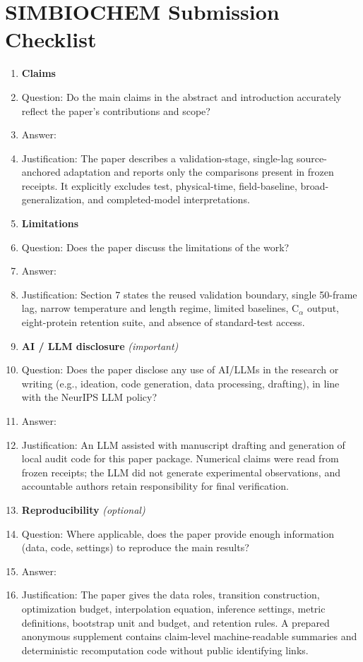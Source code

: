 \documentclass{article}
\newcommand{\CA}{C$_\alpha$}
\begin{document}

\newpage

\section*{SIMBIOCHEM Submission Checklist}

\begin{enumerate}

\item {\bf Claims}
    \item[] Question: Do the main claims in the abstract and introduction accurately reflect the paper's contributions and scope?
    \item[] Answer: \answerYes{}
    \item[] Justification: The paper describes a validation-stage, single-lag source-anchored adaptation and reports only the comparisons present in frozen receipts. It explicitly excludes test, physical-time, field-baseline, broad-generalization, and completed-model interpretations.

\item {\bf Limitations}
    \item[] Question: Does the paper discuss the limitations of the work?
    \item[] Answer: \answerYes{}
    \item[] Justification: Section 7 states the reused validation boundary, single 50-frame lag, narrow temperature and length regime, limited baselines, \CA{} output, eight-protein retention suite, and absence of standard-test access.

\item {\bf AI / LLM disclosure} \emph{(important)}
    \item[] Question: Does the paper disclose any use of AI/LLMs in the research or writing (e.g., ideation, code generation, data processing, drafting), in line with the NeurIPS LLM policy?
    \item[] Answer: \answerYes{}
    \item[] Justification: An LLM assisted with manuscript drafting and generation of local audit code for this paper package. Numerical claims were read from frozen receipts; the LLM did not generate experimental observations, and accountable authors retain responsibility for final verification.

\item {\bf Reproducibility} \emph{(optional)}
    \item[] Question: Where applicable, does the paper provide enough information (data, code, settings) to reproduce the main results?
    \item[] Answer: \answerYes{}
    \item[] Justification: The paper gives the data roles, transition construction, optimization budget, interpolation equation, inference settings, metric definitions, bootstrap unit and budget, and retention rules. A prepared anonymous supplement contains claim-level machine-readable summaries and deterministic recomputation code without public identifying links.

\end{enumerate}
\end{document}
